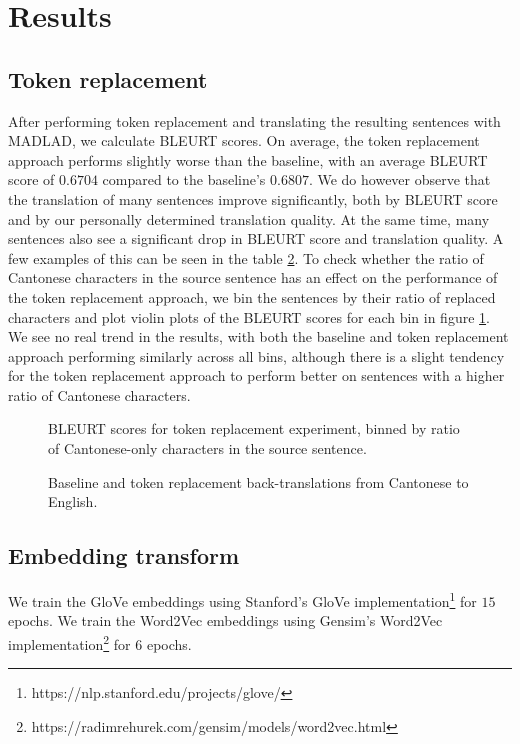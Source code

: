 \section{Results}
\subsection{Token replacement}
After performing token replacement and translating the resulting sentences with \textsc{MADLAD}, we calculate BLEURT scores. On average, the token replacement approach performs slightly worse than the baseline, with an average BLEURT score of $0.6704$ compared to the baseline's $0.6807$. We do however observe that the translation of many sentences improve significantly, both by BLEURT score and by our personally determined translation quality. At the same time, many sentences also see a significant drop in BLEURT score and translation quality. A few examples of this can be seen in the table \ref{table:tokenreplacementexample}.
To check whether the ratio of Cantonese characters in the source sentence has an effect on the performance of the token replacement approach, we bin the sentences by their ratio of replaced characters and plot violin plots of the BLEURT scores for each bin in figure \ref{fig:bleurt_token_replacement}. We see no real trend in the results, with both the baseline and token replacement approach performing similarly across all bins, although there is a slight tendency for the token replacement approach to perform better on sentences with a higher ratio of Cantonese characters.
\label{results:token_replacement}
\begin{figure}[H]
    \BLEURTtokenreplacementviolin
    \caption{BLEURT scores for token replacement experiment, binned by ratio of Cantonese-only characters in the source sentence.}
    \label{fig:bleurt_token_replacement}
\end{figure}

\begin{figure}[H]
    \tokenreplacementexample
    \caption{Baseline and token replacement back-translations from Cantonese to English. }
    \label{table:tokenreplacementexample}
\end{figure}
\subsection{Embedding transform}
\label{results:embedding_transform}
We train the GloVe embeddings using Stanford's GloVe implementation\footnote{https://nlp.stanford.edu/projects/glove/} for $15$ epochs. We train the Word2Vec embeddings using Gensim's Word2Vec implementation\footnote{https://radimrehurek.com/gensim/models/word2vec.html} for $6$ epochs.

